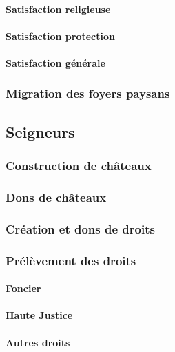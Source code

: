 		\paragraph{Satisfaction religieuse}
		\paragraph{Satisfaction protection}
		\paragraph{Satisfaction générale}
	\subsubsection{Migration des foyers paysans \label{sssec:migration}}
	
\subsection{Seigneurs}
	\subsubsection{Construction de châteaux \label{sssec:constru-chateaux}}
	\subsubsection{Dons de châteaux}
	\subsubsection{Création et dons de droits}
	\subsubsection{Prélèvement des droits \label{sssec:collecte-droits}}
		\paragraph{Foncier}
		\paragraph{Haute Justice}
		\paragraph{Autres droits}

\printbibliography[title={Références}]
